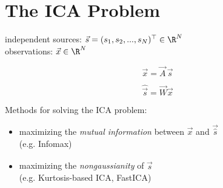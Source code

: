 
\section{The ICA Problem}
\begin{frame}{\secname}

independent sources: $\vec s = (s_1, s_2,...,s_N)^\top \in \R^N$\\
observations: $\vec x \in \R^N$

\begin{equation}
\label{eq:ica}
\vec x = \vec A \, \vec s
\end{equation}

\begin{equation}
\widehat{\vec s} = \vec W \vec x
\end{equation}

Methods for solving the ICA problem:

\begin{itemize}
\item maximizing the \emph{mutual information} between $\vec x$ and $\vec {\hat s}$ \\
(e.g. Infomax)
\item maximizing the \emph{nongaussianity} of $\widehat {\vec s}$ \\
(e.g. Kurtosis-based ICA, FastICA)
\end{itemize}
\end{frame}


